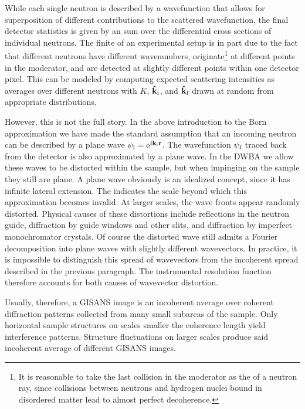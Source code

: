 While each single neutron is described by a wavefunction
that allows for  superposition of
different contributions to the scattered wavefunction,
the final detector statistics
%
is given by an  sum
over the differential cross sections of individual neutrons.
The finite 
%
of an experimental setup is in part due to the fact that
different neutrons have different wavenumbers,
originate\footnote
{It is reasonable to take the last collision in the moderator
  as the  of a neutron ray,
  since collisions between neutrons and hydrogen nuclei bound in
  disordered matter lead to almost perfect decoherence.}
at different points in the moderator,
and are detected at slightly different points within one detector pixel.
This can be modeled by computing expected scattering intensities as
averages over different neutrons with
$K$, $\v{\hat k}_\si$, and $\v{\hat k}_\sf$ drawn at random
from appropriate distributions.

However, this is not the full story.
In the above introduction to the Born approximation
we have made the standard assumption
that an incoming neutron can be described by a plane wave
$\psi_\si=\e^{i\k_\si\r}$.
The wavefunction $\psi_\sf$ traced back from the detector is also
approximated by a plane wave.
In the DWBA we allow these waves to be distorted within the sample,
but when impinging on the sample they still are plane.
A plane wave obviously is an idealized concept,
since it has infinite lateral extension.
The  indicates the scale
beyond which this approximation becomes invalid.
At larger scales, the wave fronts appear randomly distorted.
Physical causes of these distortions include
reflections in the neutron guide,
diffraction by guide windows and other slits,
and diffraction by imperfect monochromator crystals.
Of course the distorted wave still admits a Fourier decomposition
into plane waves with slightly different wavevectors.
In practice, it is impossible to distinguish this spread of wavevectors
from the incoherent spread described in the previous paragraph.
The instrumental resolution function therefore
accounts for both causes of wavevector distortion.
%

Usually, therefore, a GISANS image is an incoherent average
over coherent diffraction patterns collected from
many small subareas of the sample.
Only horizontal sample structures on scales smaller the coherence length
yield interference patterns.
Structure fluctuations on larger scales
produce said incoherent average of different GISANS images.

